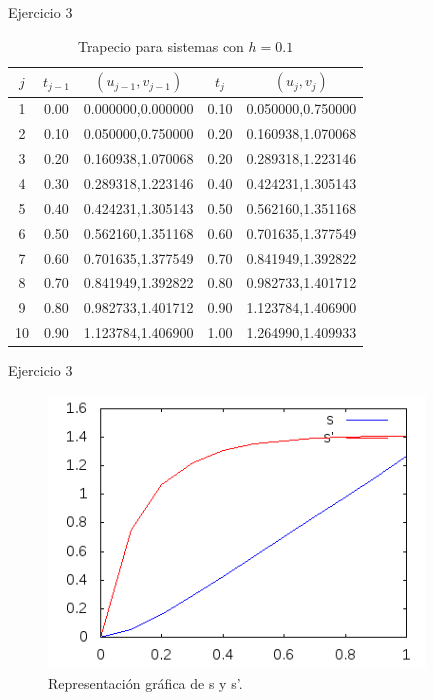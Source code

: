 		\begin{frame}{Ejercicio 3}
			\begin{table}[H]
				\centering
				\begin{tabular}{|| c | c | c | c | c ||}
					\hline
					\hline $j$ &  $t_{j-1}$ & $(u_{j-1},v_{j-1})$ & $t_j$ & $(u_{j},v_{j})$ \\
					\hline 1 & 0.00 & 0.000000,0.000000 & 0.10 & 0.050000,0.750000 \\
					\hline 2 & 0.10 & 0.050000,0.750000 & 0.20 & 0.160938,1.070068 \\
					\hline 3 & 0.20 & 0.160938,1.070068 & 0.20 & 0.289318,1.223146 \\
					\hline 4 & 0.30 & 0.289318,1.223146 & 0.40 & 0.424231,1.305143 \\
					\hline 5 & 0.40 & 0.424231,1.305143 & 0.50 & 0.562160,1.351168 \\
					\hline 6 & 0.50 & 0.562160,1.351168 & 0.60 & 0.701635,1.377549 \\
					\hline 7 & 0.60 & 0.701635,1.377549 & 0.70 & 0.841949,1.392822 \\
					\hline 8 & 0.70 & 0.841949,1.392822 & 0.80 & 0.982733,1.401712 \\
					\hline 9 & 0.80 & 0.982733,1.401712 & 0.90 & 1.123784,1.406900 \\
					\hline 10 & 0.90 & 1.123784,1.406900 & 1.00 & 1.264990,1.409933 \\
					\hline
					\hline					
				\end{tabular}
				\caption{Trapecio para sistemas con $h=0.1$}
			\end{table}	
		\end{frame}
		
		\begin{frame}{Ejercicio 3}
			\begin{figure}[h]
				\centering
				\includegraphics[width=10cm]{./Images/ejemplo3-1.png}
				\caption{Representación gráfica de s y s'.}
			\end{figure}	
		\end{frame}										
													
